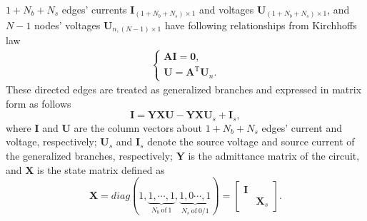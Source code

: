 \documentclass{article}
\def\T{\mathrm{T}}
\begin{document}
$1+N_b+N_s$ edges' currents $\bm{I}_{(1+N_b+N_s)\times 1}$ and voltages $\bm{U}_{(1+N_b+N_s)\times 1}$, and $N-1$ nodes' voltages $\bm{U}_{n, (N-1)\times 1}$ have following relationships from Kirchhoffs law
\begin{align}\label{eq:Kirchhoffs_law}
    \begin{cases}
    \bm{A} \bm{I} = \bm{0}, \\
    \bm{U}        = \bm{A}^\T \bm{U}_n.
    \end{cases}
\end{align}
These directed edges are treated as generalized branches and expressed in matrix form as follows
\begin{equation}\label{eq:generalized_branches}
    \bm{I} = \bm{Y}\bm{X} \bm{U} - \bm{Y}\bm{X} \bm{U}_s +\bm{I}_s,
\end{equation}
where $\bm{I}$ and $\bm{U}$ are the column vectors about $1+N_b+N_s$ edges' current and voltage, respectively; 
$\bm{U}_s$ and $\bm{I}_s$ denote the source voltage and source current of the generalized branches, respectively;
$\bm{Y}$ is the admittance matrix of the circuit, and $\bm{X}$ is the state matrix defined as
\begin{equation}\label{eq:X}
    \bm{X} = diag(
        1,  
        \underbrace{1, \cdots, 1}_{N_b~\text{of}~1}, 
        \underbrace{1, 0 \cdots, 1}_{N_s~\text{of}~0/1}
    )
    =\begin{bmatrix}
        \bm{I} &\\
         & \bm{X}_s
    \end{bmatrix}.
\end{equation}
\end{document}

